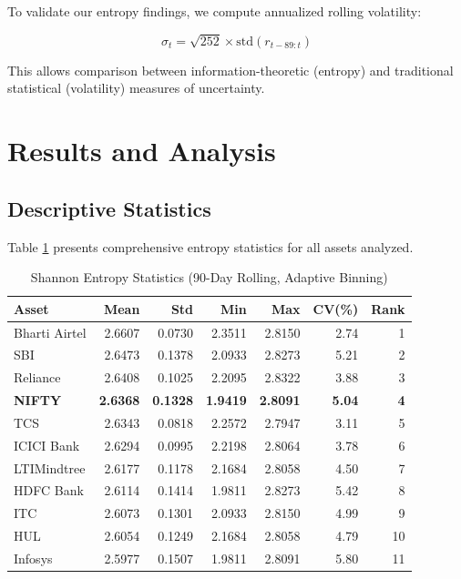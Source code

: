 \documentclass[12pt,a4paper]{article}
\begin{document}
To validate our entropy findings, we compute annualized rolling volatility:

\begin{equation}
\sigma_{t} = \sqrt{252} \times \text{std}(r_{t-89:t})
\end{equation}

This allows comparison between information-theoretic (entropy) and traditional statistical (volatility) measures of uncertainty.

\section{Results and Analysis}

\subsection{Descriptive Statistics}

Table \ref{tab:entropy_stats} presents comprehensive entropy statistics for all assets analyzed.

\begin{table}[H]
\centering
\caption{Shannon Entropy Statistics (90-Day Rolling, Adaptive Binning)}
\label{tab:entropy_stats}
\begin{tabular}{@{}lrrrrrr@{}}
\toprule
\textbf{Asset} & \textbf{Mean} & \textbf{Std} & \textbf{Min} & \textbf{Max} & \textbf{CV(\%)} & \textbf{Rank} \\ \midrule
Bharti Airtel & 2.6607 & 0.0730 & 2.3511 & 2.8150 & 2.74 & 1 \\
SBI & 2.6473 & 0.1378 & 2.0933 & 2.8273 & 5.21 & 2 \\
Reliance & 2.6408 & 0.1025 & 2.2095 & 2.8322 & 3.88 & 3 \\
\textbf{NIFTY} & \textbf{2.6368} & \textbf{0.1328} & \textbf{1.9419} & \textbf{2.8091} & \textbf{5.04} & \textbf{4} \\
TCS & 2.6343 & 0.0818 & 2.2572 & 2.7947 & 3.11 & 5 \\
ICICI Bank & 2.6294 & 0.0995 & 2.2198 & 2.8064 & 3.78 & 6 \\
LTIMindtree & 2.6177 & 0.1178 & 2.1684 & 2.8058 & 4.50 & 7 \\
HDFC Bank & 2.6114 & 0.1414 & 1.9811 & 2.8273 & 5.42 & 8 \\
ITC & 2.6073 & 0.1301 & 2.0933 & 2.8150 & 4.99 & 9 \\
HUL & 2.6054 & 0.1249 & 2.1684 & 2.8058 & 4.79 & 10 \\
Infosys & 2.5977 & 0.1507 & 1.9811 & 2.8091 & 5.80 & 11 \\ \bottomrule
\end{tabular}
\end{table}
\end{document}
